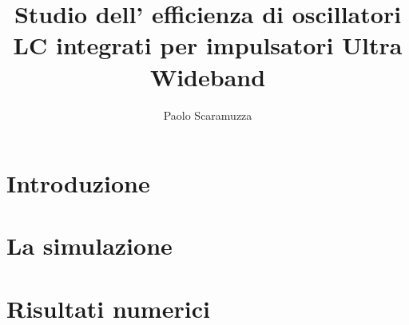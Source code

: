 \documentclass[a4paper]{article}
\author{Paolo Scaramuzza}
\title{Studio dell' efficienza di oscillatori LC integrati per impulsatori 
	Ultra Wideband}
\date{} %
\begin{document}
\maketitle

\section{Introduzione}

\section{La simulazione}

\section{Risultati numerici}
\end{document}
